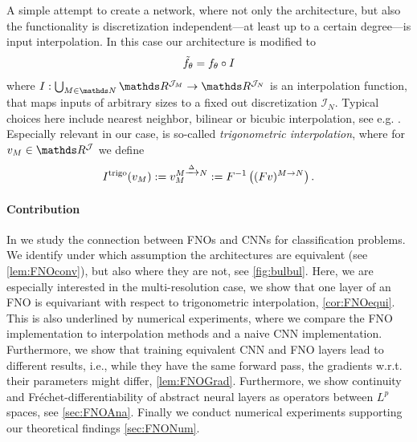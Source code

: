 A simple attempt to create a network, where not only the architecture, but also the functionality is discretization independent---at least up to a certain degree---is input interpolation. In this case our architecture is modified to
%
\begin{align*}
\tilde {f}_\theta = f_\theta \circ I
\end{align*}
%
where $I:\bigcup_{M\in\N} \R^{\mathcal{J}_M} \to \R^{\mathcal{J}_N}$ is an interpolation function, that maps inputs of arbitrary sizes to a fixed out discretization $\mathcal{I}_N$. Typical choices here include nearest neighbor, bilinear or bicubic interpolation, see e.g. \cite{gonzales1987digital}. Especially relevant in our case, is so-called \emph{trigonometric interpolation}, where for $\imgg_M\in\R^{\mathcal{J}}$ we define
%
%
\begin{align*}
I^{\text{trigo}}(v_M) := v_M^{M \xrightarrow{\Delta} N} := F^{-1} \left( (Fv)^{M \rightarrow N}\right).
\end{align*}
%
%
\paragraph{Contribution} In \cite{kabri2023resolution} we study the connection between FNOs and CNNs for classification problems. We identify under which assumption the architectures are equivalent (see \cref{lem:FNOconv}), but also where they are not, see \cref{fig:bulbul}. Here, we are especially interested in the multi-resolution case, we show that one layer of an FNO is equivariant with respect to trigonometric interpolation, \cref{cor:FNOequi}. This is also underlined by numerical experiments, where we compare the FNO implementation to interpolation methods and a naive CNN implementation. Furthermore, we show that training equivalent CNN and FNO layers lead to different results, i.e., while they have the same forward pass, the gradients w.r.t. their parameters might differ, \cref{lem:FNOGrad}. Furthermore, we show continuity and Fréchet-differentiability of abstract neural layers as operators between $L^p$ spaces, see \cref{sec:FNOAna}. Finally we conduct numerical experiments supporting our theoretical findings \cref{sec:FNONum}.
%
%

%
%
